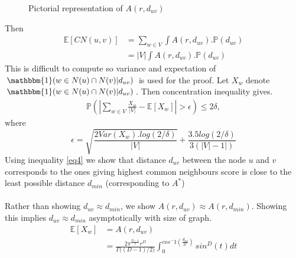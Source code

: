 \documentclass{article}
\begin{document}
\begin{figure}[htbp]
\centering
{}
    \caption{Pictorial representation of $A(r,d_{uv})$}
    \label{fig1}
    \end{figure}
Then
\begin{equation} \label{eq3}
\begin{split}
\mathbb{E}[CN(u,v)]&=\sum_{w\in V}\int A(r,d_{uv}).\mathbb{P}(d_{uv})\\
&=|V|\int A(r,d_{uv}).\mathbb{P}(d_{uv})
\end{split}
\end{equation}
This is difficult to compute so variance and expectation of $\mathbbm{1}(w\in N(u)\cap N(v)|d_{uv})$ is used for the proof. Let $X_w$ denote $\mathbbm{1}(w\in N(u)\cap N(v)|d_{uv})$. Then concentration inequality gives. 
\begin{equation} \label{eq4}
\begin{split}
\mathbb{P}(|\sum_{w \in V}\frac{X_w}{|V|}-\mathbb{E}[X_w]|>\epsilon)\leq 2\delta, 
\end{split}
\end{equation}
where 
\begin{equation}
\epsilon =\sqrt{\frac{2Var(X_w).log(2/\delta)}{|V|}}+\frac{3.5log(2/\delta)}{3(|V|-1|)}
\end{equation}
Using inequality \ref{eq4} we show that distance $d_{uv}$ between the node $u$ and $v$ corresponds to the ones giving highest common neighbours score is close to the least possible distance $d_{min}$ (corresponding to $A^*$)
\\~\\
Rather than showing $d_{uv}\approx d_{min}$, we show $A(r,d_{uv})\approx A(r,d_{min})$. Showing this implies $d_{uv}\approx d_{min}$ asymptotically with size of graph.
\
\begin{equation} \label{eq6}
\begin{split}
\mathbb{E}[X_w] &=A(r,d_{uv})\\
&=\frac{2\pi^{\frac{D-1}{2}}r^D}{\Gamma({(D-1)/2)}}\int^{cos^-1(\frac{d_{uv}}{2r})}_0sin^D(t)dt 
\end{split}
\end{equation}\\~\\
\end{document}
